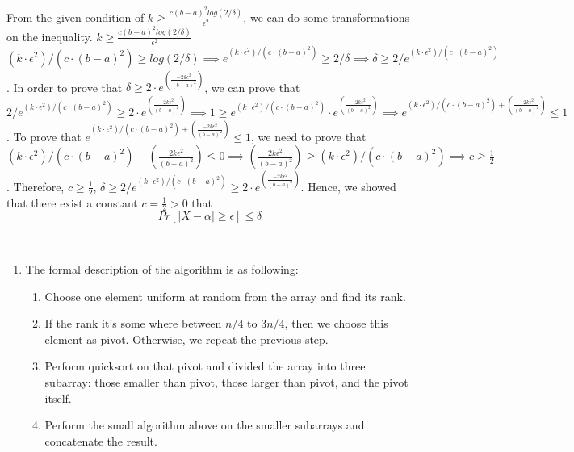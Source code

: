 \documentclass[11pt]{article}%
\begin{document}
\begin{questions}[1]
\begin{enumerate}
    
    From the given condition of $k \geq \frac {c(b-a)^2log(2/\delta)}{\epsilon ^2}$, we can do some transformations on the inequality. $k \geq \frac {c(b-a)^2log(2/\delta)}{\epsilon ^2}$ \implies $ (k \cdot \epsilon ^2) /( c\cdot(b-a)^2) \geq log(2/\delta) \implies e^{(k \cdot \epsilon ^2) /( c\cdot(b-a)^2)} \geq 2/\delta \implies \delta \geq 2/e^{(k \cdot \epsilon ^2) /( c\cdot(b-a)^2)}$.
    \newline
    \newline
    In order to prove that $ \delta \geq 2 \cdot e^{(\frac {-2k\epsilon^2}{(b-a)^2})} $, we can prove that $ 2/e^{(k \cdot \epsilon ^2) /( c\cdot(b-a)^2)} \geq 2 \cdot e^{(\frac {-2k\epsilon^2}{(b-a)^2})} \implies 1 \geq e^{(k \cdot \epsilon ^2) /( c\cdot(b-a)^2)} \cdot e^{(\frac {-2k\epsilon^2}{(b-a)^2})}  \implies e^{(k \cdot \epsilon^2) /( c\cdot(b-a)^2) +(\frac {-2k\epsilon^2}{(b-a)^2})} \leq 1$.
    \newline
    \newline
    To prove that $ e^{(k \cdot \epsilon^2) /( c\cdot(b-a)^2) + (\frac {-2k\epsilon^2}{(b-a)^2})} \leq 1$, we need to prove that $ (k \cdot \epsilon^2) /( c\cdot(b-a)^2) - (\frac {2k\epsilon^2}{(b-a)^2}) \leq 0 \implies (\frac {2k\epsilon^2}{(b-a)^2}) \geq (k \cdot \epsilon^2) /( c\cdot(b-a)^2) \implies c \geq \frac {1}{2}$. Therefore, $c \geq \frac{1}{2}$, $\delta \geq 2/e^{(k \cdot \epsilon^2) /( c\cdot(b-a)^2)} \geq 2 \cdot e^{(\frac {-2k\epsilon^2}{(b-a)^2})}$. 
    \newline
    Hence, we showed that there exist a constant $c = \frac{1}{2} > 0$ that
    $$Pr[|X-\alpha| \geq \epsilon] \leq \delta $$
    \end{enumerate} 
    \\
    \item \begin{enumerate}
    \item The formal description of the algorithm is as following:
    \begin{enumerate}
        \item Choose one element uniform at random from the array and find its rank.
        \item If the rank it's some where between $n/4$ to $3n/4$, then we choose this element as pivot. Otherwise, we repeat the previous step.
        \item Perform quicksort on that pivot and divided the array into three subarray: those smaller than pivot, those larger than pivot, and the pivot itself.
        \item Perform the small algorithm above on the smaller subarrays and concatenate the result.

\end{enumerate}
\end{enumerate}
\end{questions}
\end{document}
